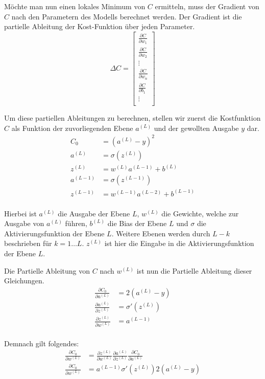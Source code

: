Möchte man nun einen lokales Minimum von $C$ ermitteln, muss der Gradient von $C$ nach den Parametern des Modells berechnet werden. Der Gradient ist die partielle Ableitung der Kost-Funktion über jeden Parameter.
\begin{equation}
    \Delta C = \begin{bmatrix}
        \frac{\partial C}{\partial w_1} \\
        \frac{\partial C}{\partial w_2} \\
        \vdots \\
        \frac{\partial C}{\partial w_n} \\
        \frac{\partial C}{\partial b_1} \\
        \vdots \\
        \end{bmatrix}
\end{equation}

Um diese partiellen Ableitungen zu berechnen, stellen wir zuerst die Kostfunktion $C$ als Funktion der zuvorliegenden Ebene $a^{(L)}$  und der gewollten Ausgabe $y$ dar.
\begin{align}
    C_0 &= (a^{(L)} - y)^2\\
    a^{(L)} &= \sigma(z^{(L)})\\
    z^{(L)} &= w^{(L)}a^{(L-1)} + b^{(L)}\\
    a^{(L-1)} &= \sigma(z^{(L-1)})\\
    z^{(L-1)} &= w^{(L-1)}a^{(L-2)} + b^{(L-1)}\\
\end{align}

Hierbei ist $a^{(L)}$ die Ausgabe der Ebene $L$, $w^{(L)}$ die Gewichte, welche zur Ausgabe von $a^{(L)}$ führen, $b^{(L)}$ die Bias der Ebene $L$ und $\sigma$ die Aktivierungsfunktion der Ebene $L$.
Weitere Ebenen werden durch $L-k$ beschrieben für $k=1\hdots L$. $z^{(L)}$ ist hier die Eingabe in die Aktivierungsfunktion der Ebene $L$.

Die Partielle Ableitung von $C$ nach $w^{(L)}$ ist nun die Partielle Ableitung dieser Gleichungen.
\begin{align}
    \frac{\partial C_0}{\partial a^{(L)}} &= 2(a^{(L)} - y)\\
    \frac{\partial a^{(L)}}{\partial z^{(L)}} &= \sigma'(z^{(L)})\\
    \frac{\partial z^{(L)}}{\partial w^{(L)}} &= a^{(L-1)}\\
\end{align}

Demnach gilt folgendes:
\begin{align}
    \frac{\partial C_0}{\partial w^{(L)}} &= \frac{\partial z^{(L)}}{\partial w^{(L)}}\frac{\partial a^{(L)}}{\partial z^{(L)}}\frac{\partial C_0}{\partial a^{(L)}}\\
    \frac{\partial C_0}{\partial w^{(L)}} &= a^{(L-1)}\sigma'(z^{(L)})2(a^{(L)} - y)\\
\end{align}


